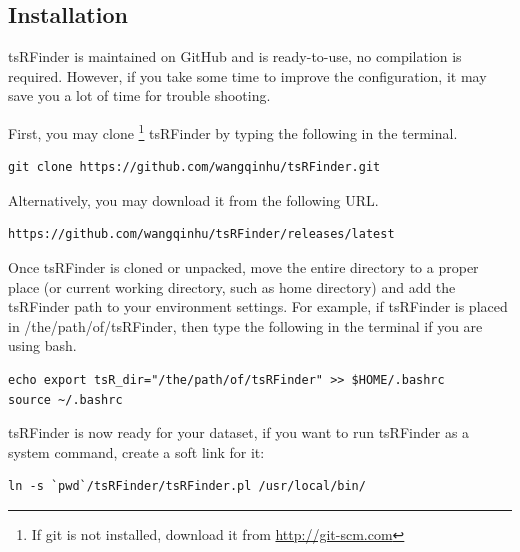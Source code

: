\documentclass[11pt, a4paper]{article}
\begin{document}
\subsection{Installation}

tsRFinder is maintained on GitHub and is ready-to-use, no compilation is required. However, if you take some time to improve the configuration, it may save you a lot of time for trouble shooting.

First, you may clone \footnote{If git is not installed, download it from \url{http://git-scm.com}} tsRFinder by typing the following in the terminal.

{\footnotesize \begin{tcolorbox}[colback=blue!5!white,colframe=pink!75!black,title=Clone tsRFinder]
\begin{verbatim}
git clone https://github.com/wangqinhu/tsRFinder.git
\end{verbatim}
\end{tcolorbox}}

Alternatively, you may download it from the following URL.

{\footnotesize \begin{tcolorbox}[colback=blue!5!white,colframe=pink!75!black,title=Latest release of tsRFinder]
\begin{verbatim}
https://github.com/wangqinhu/tsRFinder/releases/latest
\end{verbatim}
\end{tcolorbox}}

Once tsRFinder is cloned or unpacked, move the entire directory to a proper place (or current working directory, such as home directory) and add the tsRFinder path to your environment settings. For example, if tsRFinder is placed in /the/path/of/tsRFinder, then type the following in the terminal if you are using bash.

{\footnotesize \begin{tcolorbox}[colback=blue!5!white,colframe=pink!75!black,title=Setup tsRFinder]
\begin{verbatim}
echo export tsR_dir="/the/path/of/tsRFinder" >> $HOME/.bashrc
source ~/.bashrc
\end{verbatim}
\end{tcolorbox}}

tsRFinder is now ready for your dataset, if you want to run tsRFinder as a system command, create a soft link for it:

{\footnotesize \begin{tcolorbox}[colback=blue!5!white,colframe=pink!75!black,title=Make a soft link for tsRFinder]
\begin{verbatim}
ln -s `pwd`/tsRFinder/tsRFinder.pl /usr/local/bin/
\end{verbatim}
\end{tcolorbox}}
\end{document}
